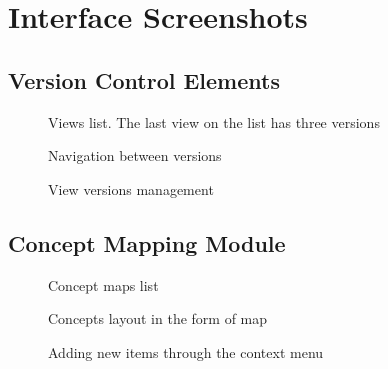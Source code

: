 \chapter{Interface Screenshots \label{cha:appscreen}}

\section{Version Control Elements}

\begin{figure}[htb]
\centering
\setlength\fboxsep{0pt}
\setlength\fboxrule{0.5pt}
\fbox{\texttt{[image: AD-F1-V1]}}
\caption[Views list]{Views list. The last view on the list has three versions}
\end{figure}

\begin{figure}[htb]
\centering
\setlength\fboxsep{0pt}
\setlength\fboxrule{0.5pt}
\fbox{\texttt{[image: AD-F1-V3]}}
\caption{Navigation between versions}
\end{figure}

\begin{figure}[htb]
\centering
\setlength\fboxsep{0pt}
\setlength\fboxrule{0.5pt}
\fbox{\texttt{[image: AD-F1-V2]}}
\caption{View versions management}
\end{figure}

\section{Concept Mapping Module}
\begin{figure}[htb]
\centering
\setlength\fboxsep{0pt}
\setlength\fboxrule{0.5pt}
\caption{Concept maps list}
\end{figure}
 
\begin{figure}[ht!]
\centering
\setlength\fboxsep{0pt}
\setlength\fboxrule{0.5pt}
\caption{Concepts layout in the form of map}
\end{figure}

\begin{figure}[ht!]
\centering
\setlength\fboxsep{0pt}
\setlength\fboxrule{0.5pt}
\caption{Adding new items through the context menu}
\end{figure}

